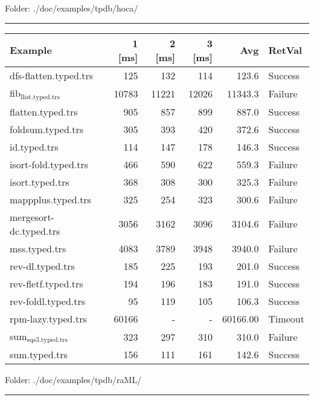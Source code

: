 \documentclass[11pt]{article}
\begin{document}
Folder: ./doc/examples/tpdb/hoca/

\rule{\linewidth}{0.5pt}

\begin{center}
\begin{tabular}{lrrrrl}
Example & 1 [ms] & 2 [ms] & 3 [ms] & Avg & RetVal\\
\hline
dfs-flatten.typed.trs & 125 & 132 & 114 & 123.6 & Success\\
fib\(_{\text{llist.typed.trs}}\) & 10783 & 11221 & 12026 & 11343.3 & Failure\\
flatten.typed.trs & 905 & 857 & 899 & 887.0 & Success\\
foldsum.typed.trs & 305 & 393 & 420 & 372.6 & Success\\
id.typed.trs & 114 & 147 & 178 & 146.3 & Success\\
isort-fold.typed.trs & 466 & 590 & 622 & 559.3 & Failure\\
isort.typed.trs & 368 & 308 & 300 & 325.3 & Failure\\
mappplus.typed.trs & 325 & 254 & 323 & 300.6 & Failure\\
mergesort-dc.typed.trs & 3056 & 3162 & 3096 & 3104.6 & Failure\\
mss.typed.trs & 4083 & 3789 & 3948 & 3940.0 & Failure\\
rev-dl.typed.trs & 185 & 225 & 193 & 201.0 & Success\\
rev-fletf.typed.trs & 194 & 196 & 183 & 191.0 & Success\\
rev-foldl.typed.trs & 95 & 119 & 105 & 106.3 & Success\\
rpm-lazy.typed.trs & 60166 & - & - & 60166.00 & Timeout\\
sum\(_{\text{sqs3.typed.trs}}\) & 323 & 297 & 310 & 310.0 & Failure\\
sum.typed.trs & 156 & 111 & 161 & 142.6 & Success\\
\end{tabular}

\end{center}


Folder: ./doc/examples/tpdb/raML/

\rule{\linewidth}{0.5pt}
\end{document}
